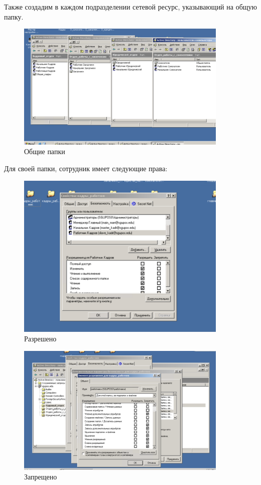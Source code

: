 Также создадим в каждом подразделении сетевой ресурс, указывающий на общую папку.
\begin{figure}[H]
  \centering
  \includegraphics[width=0.9\textwidth]{pict/prac/7}
  \caption{Общие папки}
  \label{fig:18}
\end{figure}

Для своей папки, сотрудник имеет следующие права:
\begin{figure}[H]
  \centering
  \includegraphics[width=0.9\textwidth]{pict/prac/8}
  \caption{Разрешено}
  \label{fig:20}
\end{figure}


\begin{figure}[H]
  \centering
  \includegraphics[width=0.9\textwidth]{pict/prac/61}
  \caption{Запрещено}
\end{figure}


